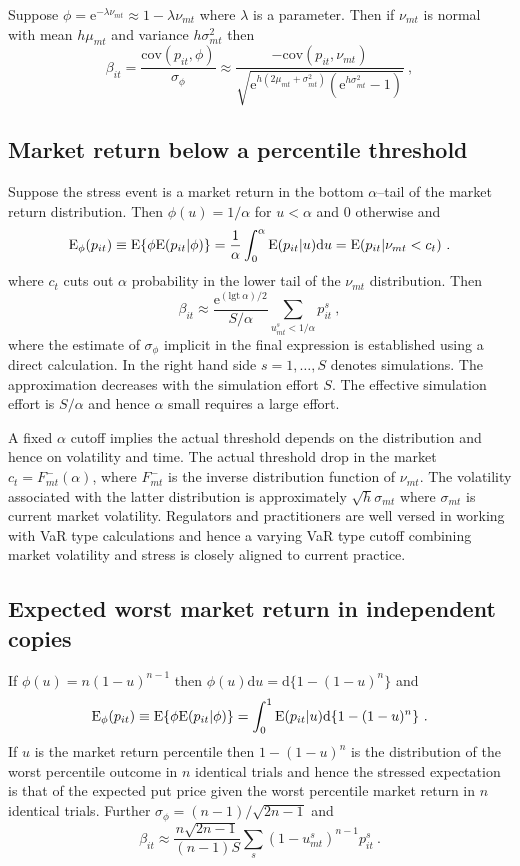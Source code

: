 \documentclass[authoryear]{elsarticle}
\newcommand{\logit}{\mathrm{lgt}}
\newcommand{\E}{\mathrm{E}}
\newcommand{\e}{\mathrm{e}}
\newcommand{\cov}{\mathrm{cov}}
\newcommand{\de}{\mathrm{d}}
\begin{document}
Suppose $\phi=\e^{-\lambda\nu_{mt}}\approx 1-\lambda\nu_{mt}$ where $\lambda$ is a parameter.   Then  if $\nu_{mt}$ is normal with mean $h\mu_{mt}$ and variance $ h\sigma^2_{mt}$ then
$$
\beta_{it} = \frac{\cov(p_{it},\phi)}{\sigma_\phi}  \approx \frac{-\cov(p_{it},\nu_{mt})}{\sqrt{\e^{h(2\mu_{mt}+\sigma_{mt}^2)}\left(\e^{h\sigma_{mt}^2}-1\right)}}\ ,
$$
\subsection{Market return below a percentile threshold} 

Suppose the stress event is a market return in the bottom $\alpha$--tail of the  market return distribution.   Then  $\phi(u)=1/\alpha$ for $u< \alpha$ and 0  otherwise and
$$
\Es(p_{it}) \equiv \E\{\phi\E(p_{it}|\phi)\} = \frac{1}{\alpha}\int_0^\alpha\E(p_{it}|u)\de u = \E(p_{it}|\nu_{mt}<c_{t}) \ .
$$
where $c_t$ cuts out $\alpha$ probability in the lower tail of the $\nu_{mt}$ distribution.   Then
$$
\beta_{it} \approx  \frac{\e^{(\logit\ \alpha)/2}}{S/\alpha} \sum_{u^s_{mt}<1/\alpha}  p_{it}^s\ ,
$$
where the estimate of $\sigma_\phi$ implicit in the final expression is established using a direct calculation.  In the right hand side $s=1,\ldots,S$ denotes simulations.  The approximation decreases with the simulation effort $S$.   The effective simulation effort is $S/\alpha$ and hence $\alpha$ small requires a  large effort.

A fixed $\alpha$ cutoff  implies the actual threshold depends on the distribution and hence  on volatility and  time.  The actual threshold drop in the market $c_t=F_{mt}^-(\alpha)$, where $F_{mt}^-$ is the inverse distribution function of $\nu_{mt}$.  The volatility associated with the latter distribution is approximately $\sqrt{h}\sigma_{mt}$ where $\sigma_{mt}$ is current market volatility.   Regulators and practitioners  are well versed in working with VaR type calculations and hence a varying VaR type cutoff combining market volatility and stress is closely aligned to current practice. 


\subsection{Expected worst market return in independent copies} 
If $\phi(u)=n(1-u)^{n-1}$ then $\phi(u)\de u = \de\{1-(1-u)^n\}$ and 
$$
\Es(p_{it}) \equiv \E\{\phi\E(p_{it}|\phi)\} = \int_0^1\E(p_{it}|u)\de\{1-(1-u)^n\}\ .
$$
If $u$ is the market return percentile then  $1-(1-u)^n$ is the distribution of the worst percentile outcome in $n$ identical trials and hence the stressed expectation is that of the expected put price given the worst percentile market return in $n$ identical trials.  Further 
 $\sigma_\phi=(n-1)/\sqrt{2n-1}$ and 
$$
\beta_{it}  \approx \frac{n\sqrt{2n-1}}{(n-1)S} \sum_s (1-u^s_{mt})^{n-1}p_{it}^s \ . 
$$
\end{document}
